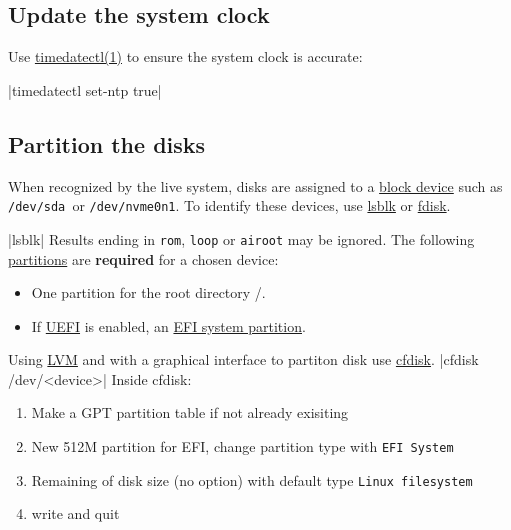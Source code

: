 \documentclass[11pt,A4]{article}
\newcommand{\linecode}[1]{ \mint[fontsize=\small,bgcolor=ArchCode,frame=single]{bash}|#1|}
\begin{document}
\subsection{Update the system clock}
Use \href{https://jlk.fjfi.cvut.cz/arch/manpages/man/timedatectl.1}{timedatectl(1)} to ensure the system clock is accurate:

\linecode{timedatectl set-ntp true}

\vspace{-5mm}
\subsection{Partition the disks}
When recognized by the live system, disks are assigned to a \href{https://wiki.archlinux.org/index.php/Device_file#Block_devices}{block device} such as \texttt{/dev/sda }or \texttt{/dev/nvme0n1}. To identify these devices, use \href{https://wiki.archlinux.org/index.php/Lsblk}{lsblk} or \href{https://wiki.archlinux.org/index.php/Fdisk}{fdisk}.

\linecode{lsblk}
Results ending in \texttt{rom}, \texttt{loop} or \texttt{airoot} may be ignored.
The following \href{https://wiki.archlinux.org/index.php/Partition}{partitions} are \textbf{required} for a chosen device:
\begin{itemize}
    \item One partition for the root directory /.
    \item If \href{https://wiki.archlinux.org/index.php/UEFI}{UEFI} is enabled, an \href{https://wiki.archlinux.org/index.php/EFI_system_partition}{EFI system partition}.
\end{itemize}
Using \href{https://wiki.archlinux.org/index.php/LVM}{LVM} and with
a graphical interface to partiton disk use \href{https://jlk.fjfi.cvut.cz/arch/manpages/man/cfdisk.8}{cfdisk}.
\linecode{cfdisk /dev/<device>}
Inside cfdisk:
\begin{enumerate}
    \item Make a GPT partition table if not already exisiting
    \item New 512M partition for EFI, change partition type with \texttt{EFI System}
    \item Remaining of disk size (no option) with default type \texttt{Linux filesystem} 
    \item write and quit 
\end{enumerate}
\end{document}
